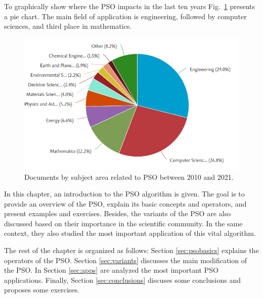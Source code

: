 To graphically show where the PSO impacts in the last ten years Fig.~\ref{fig:PSOarea}  presents a pie chart. The main field of application is engineering, followed by computer sciences, and third place in mathematics.

\begin{figure}[h!]
  \centering
  \includegraphics[scale=0.5]{"Part 2 - Search-Based Optimization/Particle Swarm Optimization/Images/PSO Area.PNG"}
  \caption{Documents by subject area related to PSO between 2010 and 2021. \label{fig:PSOarea}}
\end{figure}

In this chapter, an introduction to the PSO algorithm is given. The goal is to provide an overview of the PSO, explain its basic concepts and operators, and present examples and exercises. Besides, the variants of the PSO are also discussed based on their importance in the scientific community. In the same context, they also studied the most important application of this vital algorithm.

The rest of the chapter is organized as follows: Section \ref{sec:psobasics} explains the operators of the PSO. Section \ref{sec:variants} discusses the main modification of the PSO. In Section \ref{sec:apps} are analyzed the most important PSO applications. Finally, Section \ref{sec:conclusions} discuses some conclusions and proposes some exercises.


